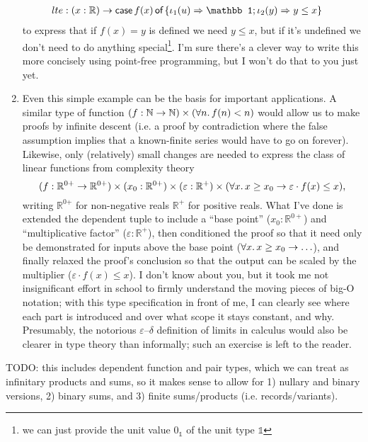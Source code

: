 \documentclass[11pt]{article} %
\theoremstyle{definition}
\theoremstyle{remark}
\newenvironment{aside}
  {\begin{mdframed}[style=0,%
      leftline=false,rightline=false,leftmargin=2em,rightmargin=2em,%
          innerleftmargin=0pt,innerrightmargin=0pt,linewidth=0.75pt,%
      skipabove=7pt,skipbelow=7pt]\small}
  {\end{mdframed}}
\begin{document}
\begin{aside}
\begin{enumerate}[label=\textit{\roman*})]
\begin{align*}
      lte &: (x : \mathbb R) \to \caseof{f(x)}\{\iota_1(u) \To \mathbb 1; \iota_2(y) \To y \leq x\}
    \end{align*}
    to express that if $f(x) = y$ is defined we need $y \leq x$, but if it's undefined we don't need to do anything special\footnote{we can just provide the unit value $0_\mathbb 1$ of the unit type $\mathbb 1$}.
  I'm sure there's a clever way to write this more concisely using point-free programming, but I won't do that to you just yet.
\item
  Even this simple example can be the basis for important applications.
  A similar type of function $(f : \mathbb N \to \mathbb N) \times ({\forall}{n}.\, f(n) < n)$ would allow us to make proofs by infinite descent (i.e. a proof by contradiction where the false assumption implies that a known-finite series would have to go on forever).
  Likewise, only (relatively) small changes are needed to express the class of linear functions from complexity theory
    $$(f : \mathbb R^{0\mathord+} \to \mathbb R^{0\mathord+}) \times (x_0 : \mathbb R^{0\mathord+}) \times (\varepsilon : \mathbb R^+)\times ({\forall}{x}.\, x \geq x_0 \to \varepsilon \cdot f(x) \leq x)\text{,}$$
    writing $\mathbb R^{0\mathord+}$ for non-negative reals $\mathbb R^+$ for positive reals.
  What I've done is extended the dependent tuple to include a ``base point'' ($x_0 : \mathbb R^{0+}$) and ``multiplicative factor'' ($\varepsilon : \mathbb R^+$), then conditioned the proof so that it need only be demonstrated for inputs above the base point (${\forall}{x}.\, x \geq x_0 \to \ldots$), and finally relaxed the proof's conclusion so that the output can be scaled by the multiplier ($\varepsilon \cdot f(x) \leq x$).
  I don't know about you, but it took me not insignificant effort in school to firmly understand the moving pieces of big-O notation;
    with this type specification in front of me, I can clearly see where each part is introduced and over what scope it stays constant, and why.
  Presumably, the notorious $\varepsilon$--$\delta$ definition of limits in calculus would also be clearer in type theory than informally; such an exercise is left to the reader.
\end{enumerate}
\end{aside}


TODO: this includes dependent function and pair types, which we can treat as infinitary products and sums, so it makes sense to allow for 1) nullary and binary versions, 2) binary sums, and 3) finite sums/products (i.e. records/variants).
\end{document}
